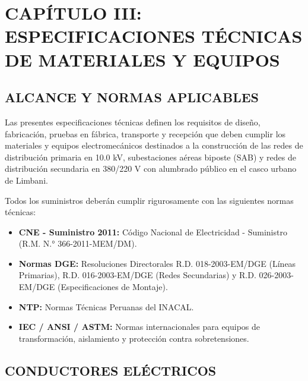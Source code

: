 \chapter*{CAPÍTULO III: ESPECIFICACIONES TÉCNICAS DE MATERIALES Y EQUIPOS}

\section{ALCANCE Y NORMAS APLICABLES}

Las presentes especificaciones técnicas definen los requisitos de diseño, fabricación, pruebas en fábrica, transporte y recepción que deben cumplir los materiales y equipos electromecánicos destinados a la construcción de las redes de distribución primaria en 10.0 kV, subestaciones aéreas biposte (SAB) y redes de distribución secundaria en 380/220 V con alumbrado público en el casco urbano de Limbani.

Todos los suministros deberán cumplir rigurosamente con las siguientes normas técnicas:
\begin{itemize}
  \item \textbf{CNE - Suministro 2011:} Código Nacional de Electricidad - Suministro (R.M. N.° 366-2011-MEM/DM).
  \item \textbf{Normas DGE:} Resoluciones Directorales R.D. 018-2003-EM/DGE (Líneas Primarias), R.D. 016-2003-EM/DGE (Redes Secundarias) y R.D. 026-2003-EM/DGE (Especificaciones de Montaje).
  \item \textbf{NTP:} Normas Técnicas Peruanas del INACAL.
  \item \textbf{IEC / ANSI / ASTM:} Normas internacionales para equipos de transformación, aislamiento y protección contra sobretensiones.
\end{itemize}

\section{CONDUCTORES ELÉCTRICOS}

